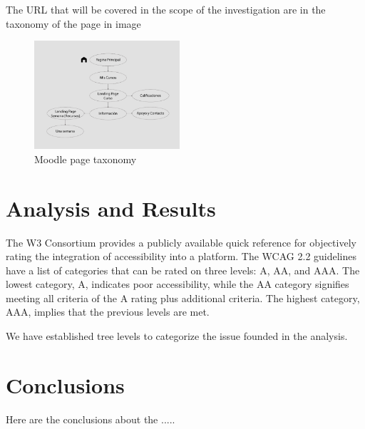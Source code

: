 \documentclass{IEEEtran}
\begin{document}
The URL that will be covered in the scope of the investigation are in the taxonomy of the page in image

\begin{figure}[H]
    \includegraphics[width=0.48\textwidth]{images/figure1.png}
    \caption{Moodle page taxonomy}
    \label{fig:figure1}
\end{figure}

\section{Analysis and Results}
The W3 Consortium provides a publicly available quick reference for objectively rating the integration of accessibility into a platform. The WCAG 2.2 guidelines have a list of categories that can be rated on three levels: A, AA, and AAA. The lowest category, A, indicates poor accessibility, while the AA category signifies meeting all criteria of the A rating plus additional criteria. The highest category, AAA, implies that the previous levels are met.

We have established tree levels to categorize the issue founded in the analysis.


\section{Conclusions}
Here are the conclusions about the .....

\nocite{}



    
\end{document}
